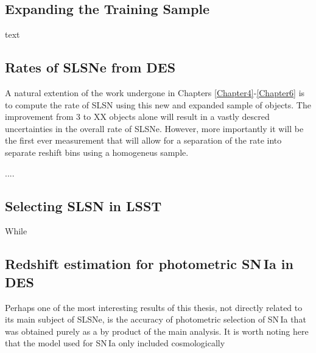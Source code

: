 \subsection{Expanding the Training Sample}
text

\subsection{Rates of SLSNe from DES}
A natural extention of the work undergone in Chapters \ref{Chapter4}-\ref{Chapter6} is to compute the rate of SLSN using this new and expanded sample of objects. The improvement from 3 to XX objects alone will result in a vastly descred uncertainties in the overall rate of SLSNe. However, more importantly it will be the first ever measurement that will allow for a separation of the rate into separate reshift bins using a homogeneus sample.

....

\subsection{Selecting SLSN in LSST}
While 

\subsection{Redshift estimation for photometric SN\,Ia in DES}
Perhaps one of the most interesting results of this thesis, not directly related to its main subject of SLSNe, is the accuracy of photometric selection of SN\,Ia that was obtained purely as a by product of the main analysis. It is worth noting here that the model used for SN\,Ia only included cosmologically
